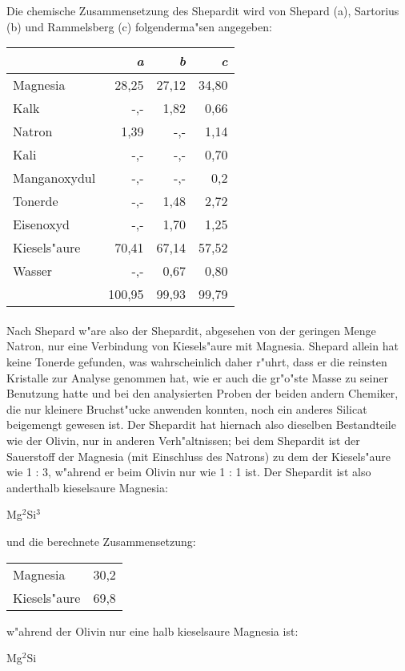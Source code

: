 \documentclass[a4paper, 11pt, oneside, german]{article}
\begin{document}
Die chemische Zusammensetzung des Shepardit wird von Shepard (a), Sartorius (b) und Rammelsberg (c) folgenderma"sen angegeben:
\begin{center}
\begin{tabular}{ |l|r|r|r| }
    \hline
     & \emph{a} & \emph{b} & \emph{c}\\
    \hline\hline
    Magnesia & 28,25 & 27,12 & 34,80\\\hline
    Kalk & -,- & 1,82 & 0,66\\\hline
    Natron & 1,39 & -,- & 1,14\\\hline
    Kali & -,- & -,- & 0,70\\\hline
    Manganoxydul & -,- & -,- & 0,2\\\hline
    Tonerde & -,- & 1,48 & 2,72\\\hline
    Eisenoxyd & -,- & 1,70 & 1,25\\\hline
    Kiesels"aure & 70,41 & 67,14 & 57,52\\\hline
    Wasser & -,- & 0,67 & 0,80\\\hline
     & 100,95 & 99,93 & 99,79\\
    \hline
\end{tabular}
\end{center}
\paragraph{}
Nach Shepard w"are also der Shepardit, abgesehen von der geringen Menge Natron, nur eine Verbindung von Kiesels"aure mit Magnesia. Shepard allein hat keine Tonerde gefunden, was wahrscheinlich daher r"uhrt, dass er die reinsten Kristalle zur Analyse genommen hat, wie er auch die gr"o"ste Masse zu seiner Benutzung hatte und bei den analysierten Proben der beiden andern Chemiker, die nur kleinere Bruchst"ucke anwenden konnten, noch ein anderes Silicat beigemengt gewesen ist. Der Shepardit hat hiernach also dieselben Bestandteile wie der Olivin, nur in anderen Verh"altnissen; bei dem Shepardit ist der Sauerstoff der Magnesia (mit Einschluss des Natrons) zu dem der Kiesels"aure wie 1 : 3, w"ahrend er beim Olivin nur wie 1 : 1 ist. Der Shepardit ist also anderthalb kieselsaure Magnesia:
\begin{center}
Mg$^{2}$Si$^{3}$
\end{center}
und die berechnete Zusammensetzung:
\begin{center}
\begin{tabular}{ l r }
    Magnesia & 30,2\\
    Kiesels"aure & 69,8\\
\end{tabular}
\end{center}
w"ahrend der Olivin nur eine halb kieselsaure Magnesia ist:
\begin{center}
Mg$^{2}$Si
\end{center}
\end{document}
